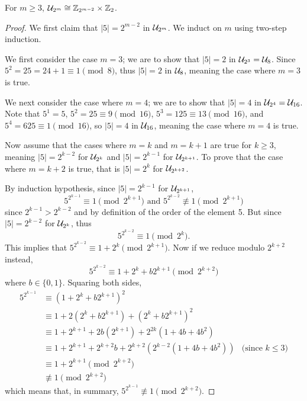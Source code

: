 \begin{proposition}\label{prop-Un-2^m}
    For $m \geq 3$, $\mathcal{U}_{2^m} \cong \mathbb{Z}_{2^{m-2}} \times \mathbb{Z}_2$.
\end{proposition}
\begin{proof}
    We first claim that $|5| = 2^{m-2}$ in $\mathcal{U}_{2^m}$. We induct on $m$ using two-step induction.

    We first consider the case $m = 3$; we are to show that $|5| = 2$ in $\mathcal{U}_{2^3} = \mathcal{U}_{8}$. Since $5^2 = 25 = 24 + 1 \equiv 1 \pmod{8}$, thus $|5| = 2$ in $\mathcal{U}_{8}$, meaning the case where $m = 3$ is true.

    We next consider the case where $m = 4$; we are to show that $|5| = 4$ in $\mathcal{U}_{2^4} = \mathcal{U}_{16}$. Note that $5^1 = 5$, $5^2 = 25 \equiv 9 \pmod{16}$, $5^3 = 125 \equiv 13 \pmod{16}$, and $5^4 = 625 \equiv 1 \pmod{16}$, so $|5| = 4$ in $\mathcal{U}_{16}$, meaning the case where $m = 4$ is true.

    Now assume that the cases where $m = k$ and $m = k+1$ are true for $k \geq 3$, meaning $|5| = 2^{k-2}$ for $\mathcal{U}_{2^k}$ and $|5| = 2^{k-1}$ for $\mathcal{U}_{2^{k+1}}$. To prove that the case where $m=k+2$ is true, that is $|5| = 2^k$ for $\mathcal{U}_{2^{k+2}}$.

    By induction hypothesis, since $|5| = 2^{k-1}$ for $\mathcal{U}_{2^{k+1}}$,
    \[
        5^{2^{k-1}} \equiv 1 \pmod{2^{k+1}} \text{ and } 5^{2^{k-2}} \not\equiv 1 \pmod{2^{k+1}}
    \]
    since $2^{k-1} > 2^{k-2}$ and by definition of the order of the element 5. But since $|5| = 2^{k-2}$ for $\mathcal{U}_{2^k}$, thus
    \[
        5^{2^{k-2}} \equiv 1 \pmod{2^k}.
    \]
    This implies that $5^{2^{k-2}} \equiv 1 + 2^k \pmod{2^{k+1}}$. Now if we reduce modulo $2^{k+2}$ instead,
    \[
            5^{2^{k-2}} \equiv 1 + 2^k + b2^{k+1} \pmod{2^{k+2}}
    \]
    where $b \in \{0, 1\}$. Squaring both sides,
    \begin{align*}
        5^{2^{k-1}} &\equiv \left(1+2^k+b2^{k+1}\right)^2\\
        &\equiv 1 + 2\left(2^k + b2^{k+1}\right) + \left(2^k + b2^{k+1}\right)^2\\
        &\equiv 1 + 2^{k+1} + 2b(2^{k+1}) + 2^{2k}(1+4b+4b^2)\\
        &\equiv 1 + 2^{k+1} + 2^{k+2}b + 2^{k+2}\left(2^{k-2}(1+4b+4b^2)\right) & \text{(since } k\leq 3)\\
        &\equiv 1+2^{k+1} \pmod{2^{k+2}}\\
        &\not\equiv 1 \pmod{2^{k+2}}
    \end{align*}
    which means that, in summary, $5^{2^{k-1}} \not\equiv 1 \pmod{2^{k+2}}$.


\end{proof}
